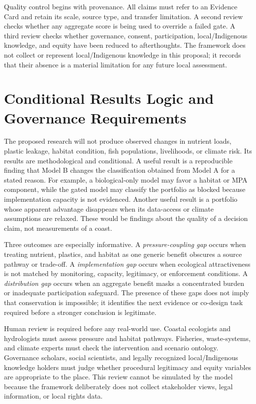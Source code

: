 \documentclass[conference]{IEEEtran}
\begin{document}
Quality control begins with provenance. All claims must refer to an Evidence Card and retain its scale, source type, and transfer limitation. A second review checks whether any aggregate score is being used to override a failed gate. A third review checks whether governance, consent, participation, local/Indigenous knowledge, and equity have been reduced to afterthoughts. The framework does not collect or represent local/Indigenous knowledge in this proposal; it records that their absence is a material limitation for any future local assessment.

\section{Conditional Results Logic and Governance Requirements}

The proposed research will not produce observed changes in nutrient loads, plastic leakage, habitat condition, fish populations, livelihoods, or climate risk. Its results are methodological and conditional. A useful result is a reproducible finding that Model B changes the classification obtained from Model A for a stated reason. For example, a biological-only model may favor a habitat or MPA component, while the gated model may classify the portfolio as blocked because implementation capacity is not evidenced. Another useful result is a portfolio whose apparent advantage disappears when its data-access or climate assumptions are relaxed. These would be findings about the quality of a decision claim, not measurements of a coast.

Three outcomes are especially informative. A \emph{pressure-coupling gap} occurs when treating nutrient, plastics, and habitat as one generic benefit obscures a source pathway or trade-off. A \emph{implementation gap} occurs when ecological attractiveness is not matched by monitoring, capacity, legitimacy, or enforcement conditions. A \emph{distribution gap} occurs when an aggregate benefit masks a concentrated burden or inadequate participation safeguard. The presence of these gaps does not imply that conservation is impossible; it identifies the next evidence or co-design task required before a stronger conclusion is legitimate.

Human review is required before any real-world use. Coastal ecologists and hydrologists must assess pressure and habitat pathways. Fisheries, waste-systems, and climate experts must check the intervention and scenario ontology. Governance scholars, social scientists, and legally recognized local/Indigenous knowledge holders must judge whether procedural legitimacy and equity variables are appropriate to the place. This review cannot be simulated by the model because the framework deliberately does not collect stakeholder views, legal information, or local rights data.
\end{document}
